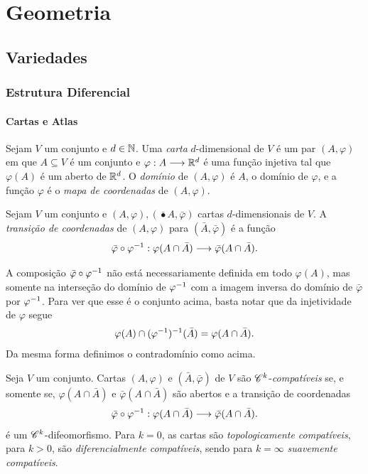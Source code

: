 \part{Geometria}

\chapter{Variedades}

\section{Estrutura Diferencial}

\subsection{Cartas e Atlas}

\begin{defi}
Sejam $V$ um conjunto e $d \in \mathbb{N}$. Uma \emph{carta} $d$-dimensional de $V$ é um par $(A,\varphi)$ em que $A \subseteq V$ é um conjunto e $\varphi: A \longrightarrow \mathbb{R}^d$ é uma função injetiva tal que $\varphi(A)$ é um aberto de $\mathbb{R}^d$. O \emph{domínio} de $(A,\varphi)$ é $A$, o domínio de $\varphi$, e a função $\varphi$ é o \emph{mapa de coordenadas} de $(A,\varphi)$.
\end{defi}

\begin{defi}
Sejam $V$ um conjunto e $(A,\varphi),(\bar{•} A,\bar\varphi)$ cartas $d$-dimensionais de $V$. A \emph{transição de coordenadas} de $(A,\varphi)$ para $(\bar A,\bar\varphi)$ é a função
	\begin{equation*}
	\bar\varphi \circ \varphi^{-1}: \varphi(A \cap \bar A) \longrightarrow \bar\varphi(A \cap \bar A).
	\end{equation*}
\end{defi}

A composição $\bar\varphi \circ \varphi^{-1}$ não está necessariamente definida em todo $\varphi(A)$, mas somente na interseção do domínio de $\varphi^{-1}$ com a imagem inversa do domínio de $\bar\varphi$ por $\varphi^{-1}$. Para ver que esse é o conjunto acima, basta notar que da injetividade de $\varphi$ segue
	\begin{equation*}
	\varphi(A) \cap (\varphi^{-1})^{-1}(\bar A) = \varphi(A \cap \bar A).
	\end{equation*}
Da mesma forma definimos o contradomínio como acima.

\begin{defi}
Seja $V$ um conjunto. Cartas $(A,\varphi)$ e $(\bar A,\bar\varphi)$ de $V$ são $\mathscr{C}^k$-\emph{compatíveis} se, e somente se, $\varphi(A \cap \bar A)$ e $\bar\varphi(A \cap \bar A)$ são abertos e a transição de coordenadas
	\begin{equation*}
	\bar\varphi \circ \varphi^{-1}: \varphi(A \cap \bar A) \longrightarrow \bar\varphi(A \cap \bar A).
	\end{equation*}
é um $\mathscr{C}^k$-difeomorfismo. Para $k=0$, as cartas são \emph{topologicamente compatíveis}, para $k>0$, são \emph{diferencialmente compatíveis}, sendo para $k=\infty$ \emph{suavemente compatíveis}.
\end{defi}

